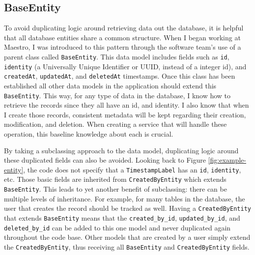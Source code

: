 \subsection{BaseEntity}

To avoid duplicating logic around retrieving data out the database, it is helpful that all database entities share a common structure.  When I began working at Maestro, I was introduced to this pattern through the software team's use of a parent class called \verb!BaseEntity!.  This data model includes fields such as \verb!id!, \verb!identity! (a Universally Unique Identifier or UUID, instead of a integer id), and \verb!createdAt!, \verb!updatedAt!, and \verb!deletedAt! timestamps.  Once this class has been established all other data models in the application should extend this \verb!BaseEntity!.  This way, for any type of data in the database, I know how to retrieve the records since they all have an id, and identity. I also know that when I create those records, consistent metadata will be kept regarding their creation, modification, and deletion. When creating a service that will handle these operation, this baseline knowledge about each is crucial.

By taking a subclassing approach to the data model, duplicating logic around these duplicated fields can also be avoided.  Looking back to Figure \ref{fig:example-entity}, the code does not specify that a \verb!TimestampLabel! has an \verb!id!, \verb!identity!, etc. Those basic fields are inherited from \verb!CreatedByEntity! which extends \verb!BaseEntity!.  This leads to yet another benefit of subclassing: there can be multiple levels of inheritance. For example, for many tables in the database, the user that creates the record should be tracked as well.  Having a \verb!CreatedByEntity! that extends \verb!BaseEntity! means that the \verb!created_by_id!, \verb!updated_by_id!, and \verb!deleted_by_id! can be added to this one model and never duplicated again throughout the code base.  Other models that are created by a user simply extend the \verb!CreatedByEntity!, thus receiving all \verb!BaseEntity! and \verb!CreatedByEntity! fields.